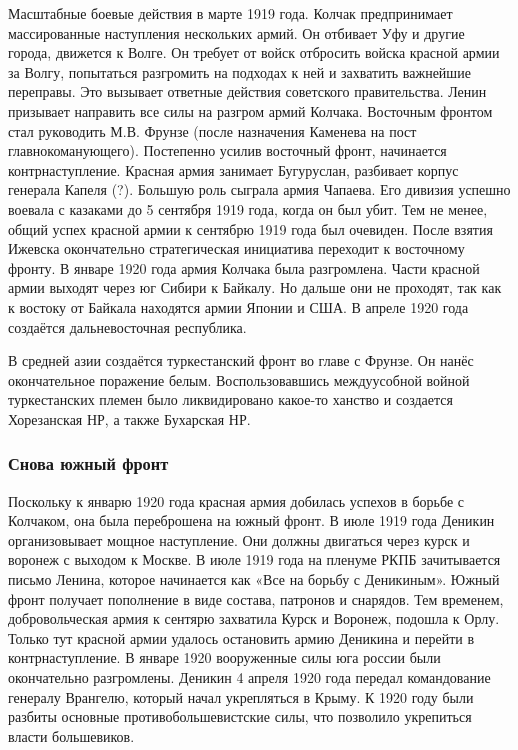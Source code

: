 Масштабные боевые действия в марте 1919 года. Колчак предпринимает массированные наступления нескольких армий. Он отбивает Уфу и другие города, движется к Волге. Он требует от войск отбросить войска красной армии за Волгу, попытаться разгромить на подходах к ней и захватить важнейшие переправы. Это вызывает ответные действия советского правительства. Ленин призывает направить все силы на разгром армий Колчака. Восточным фронтом стал руководить М.В. Фрунзе (после назначения Каменева на пост главнокоманующего). Постепенно усилив восточный фронт, начинается контрнаступление. Красная армия занимает Бугуруслан, разбивает корпус генерала Капеля (?). Большую роль сыграла армия Чапаева. Его дивизия успешно воевала с казаками до 5 сентября 1919 года, когда он был убит.
Тем не менее, общий успех красной армии к сентябрю 1919 года был очевиден. После взятия Ижевска окончательно стратегическая инициатива переходит к восточному фронту.
В январе 1920 года армия Колчака была разгромлена. Части красной армии выходят через юг Сибири к Байкалу. Но дальше они не проходят, так как к востоку от Байкала находятся армии Японии и США. В апреле 1920 года создаётся дальневосточная республика.

В средней азии создаётся туркестанский фронт во главе с Фрунзе. Он нанёс окончательное поражение белым. Воспользовавшись междуусобной войной туркестанских племен было ликвидировано какое-то ханство и создается Хорезанская НР, а также Бухарская НР.

\subsubsection{Снова южный фронт}

Поскольку к январю 1920 года красная армия добилась успехов в борьбе с Колчаком, она была переброшена на южный фронт. 
В июле 1919 года Деникин организовывает мощное наступление. Они должны двигаться через курск и воронеж с выходом к Москве. В июле 1919 года на пленуме РКПБ зачитывается письмо Ленина, которое начинается как «Все на борьбу с Деникиным». Южный фронт получает пополнение в виде состава, патронов и снарядов. Тем временем, добровольческая армия к сентярю захватила Курск и Воронеж, подошла к Орлу. Только тут красной армии удалось остановить армию Деникина и перейти в контрнаступление. В январе 1920 вооруженные силы юга россии были окончательно разгромлены. Деникин 4 апреля 1920 года передал командование генералу Врангелю, который начал укрепляться в Крыму.
К 1920 году были разбиты основные противобольшевистские силы, что позволило укрепиться власти большевиков.

